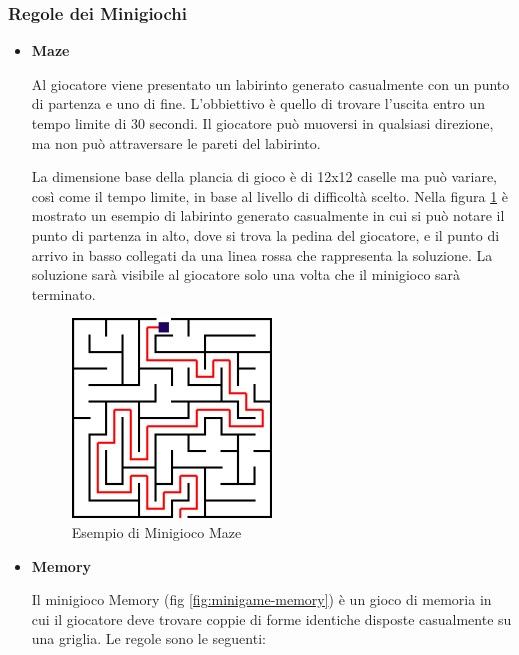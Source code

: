 \subsubsection{Regole dei Minigiochi} \label{sec:domain-model:minigames-rules}
\begin{itemize}
    \item \textbf{Maze}\par
    Al giocatore viene presentato un labirinto generato casualmente con un punto
    di partenza e uno di fine. L'obbiettivo è quello di trovare l'uscita entro
    un tempo limite di 30 secondi. Il giocatore può muoversi in qualsiasi direzione, 
    ma non può attraversare le pareti del labirinto.
    
    La dimensione base della plancia di gioco è di 12x12 caselle ma può variare, 
    così come il tempo limite, in base al livello di difficoltà scelto. Nella figura 
    \ref{fig:minigame-maze} è mostrato un esempio di labirinto generato 
    casualmente in cui si può notare il punto di partenza in alto, dove si trova 
    la pedina del giocatore, e il punto di arrivo in basso collegati da una 
    linea rossa che rappresenta la soluzione. La soluzione sarà visibile al giocatore 
    solo una volta che il minigioco sarà terminato.

    \begin{figure}[ht!]
        \centering
        \includegraphics[width=0.5\textwidth]{figures/minigame-maze.png}
        \caption{Esempio di Minigioco Maze}
        \label{fig:minigame-maze}
    \end{figure}

    \item \textbf{Memory}\par
    Il minigioco Memory (fig \ref{fig:minigame-memory}) è un gioco di memoria in cui il giocatore deve trovare coppie di 
    forme identiche disposte casualmente su una griglia. Le regole sono le seguenti:


\end{itemize}
